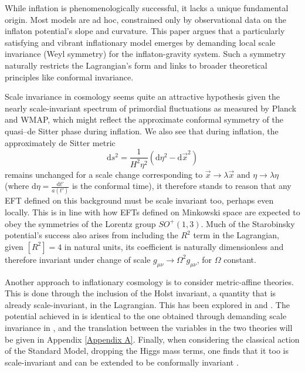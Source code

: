 \documentclass[aps,prd,reprint,preprintnumbers,showpacs,floatfix,nofootinbib,superscript address]{revtex4-2}
\begin{document}
While inflation is phenomenologically successful, it lacks a unique fundamental origin. Most models are ad hoc, constrained only by observational data on the inflaton potential’s slope and curvature. This paper argues that a particularly satisfying and vibrant inflationary model emerges by demanding local scale invariance (Weyl symmetry) for the inflaton-gravity system. Such a symmetry naturally restricts the Lagrangian’s form and links to broader theoretical principles like conformal invariance.

Scale invariance in cosmology seems quite an attractive hypothesis given the nearly scale-invariant spectrum of primordial fluctuations as measured by Planck and WMAP, which might reflect the approximate conformal symmetry of the quasi–de Sitter phase during inflation. We also see that during inflation, the approximately de Sitter metric
\begin{equation} \label{1}
    \text{d}s^2 = \frac{1}{H^2\eta^2}(\text{d}\eta^2 - \text{d}\Vec{x}^2)
\end{equation} 
remains unchanged for a scale change corresponding to $\Vec{x} \rightarrow \lambda \Vec{x} \,\, \text{and} \,\, \eta \rightarrow \lambda \eta$ (where $\text{d}\eta =  \frac{\text{d}t'}{a(t')}$ is the conformal time), it therefore stands to reason that any EFT defined on this background must be scale invariant too, perhaps even locally. This is in line with how EFTs defined on Minkowski space are expected to obey the symmetries of the Lorentz group $SO^+(1,3)$. Much of the Starobinsky potential's success also arises from including the $R^2$ term in the Lagrangian, given $[R^2] = 4$ in natural units, its coefficient is naturally dimensionless and therefore invariant under change of scale $g_{\mu\nu} \rightarrow \Omega^2 g_{\mu\nu}$, for $\Omega$ constant.

Another approach to inflationary cosmology is to consider metric-affine theories. This is done through the inclusion of the Holst invariant, a quantity that is already scale-invariant, in the Lagrangian. This has been explored in \cite{Salvio_2022} and \cite{pradisi2022equivalence}. The potential achieved in \cite{Salvio_2022} is identical to the one obtained through demanding scale invariance in \cite{barker2024poincaregaugetheoryconformal}, and the translation between the variables in the two theories will be given in Appendix \ref{Appendix A}. Finally, when considering the classical action of the Standard Model, dropping the Higgs mass terms, one finds that it too is scale-invariant and can be extended to be conformally invariant \cite{bars2014local}.
\end{document}
